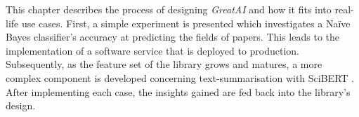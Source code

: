 This chapter describes the process of designing \textit{GreatAI} and how it fits into real-life use cases. First, a simple experiment is presented which investigates a Naïve Bayes classifier's \cite{maron1961automatic} accuracy at predicting the fields of papers. This leads to the implementation of a software service that is deployed to production. Subsequently, as the feature set of the library grows and matures, a more complex component is developed concerning text-summarisation with SciBERT \cite{beltagy2019scibert}. After implementing each case, the insights gained are fed back into the library's design.



